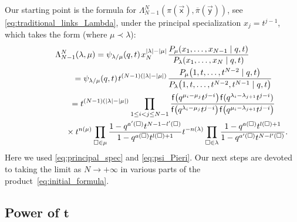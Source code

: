 \documentclass[pdftex]{sigma}
\numberwithin{equation}{section}
\begin{document}
Our starting point is the formula for
$\Lambda^{N}_{N-1}(\pi(\vec{\mathsf{x}}),\overline\pi(\vec{\mathsf{y}}))$, see
\eqref{eq:traditional_links_Lambda},
under the principal
specialization $x_j=t^{j-1}$, which takes the form (where $\mu\prec\lambda$):
\begin{gather}
	\nonumber
		\Lambda^{N}_{N-1}(\lambda,\mu)
		=
		\psi_{\lambda/\mu}(q,t)\hspace{1pt} x_N^{|\lambda|-|\mu|}\hspace{1pt}
		\frac{
		P_\mu(x_1,\dots,x_{N-1} \mid q,t )
		}
		{P_\lambda(x_1,\dots,x_N \mid q,t)}
		\\
		\nonumber
\hphantom{\Lambda^{N}_{N-1}(\lambda,\mu)}{}
=
		\psi_{\lambda/\mu}
		(q,t)\hspace{1pt}
		t^{(N-1)(|\lambda|-|\mu|)}\hspace{1pt}
		\frac{P_\mu\big(1,t,\dots,t^{N-2}\mid q,t \big)}{P_\lambda\big(1,t,\dots,t^{N-2},t^{N-1}\mid q,t\big)}
		\\
		\nonumber
\hphantom{\Lambda^{N}_{N-1}(\lambda,\mu)}{}
=
		t^{(N-1)(|\lambda|-|\mu|)}
		\prod_{1\le i<j\le N-1}
		\frac{\mathsf{f}\big(q^{\mu_i-\mu_j}t^{j-i}\big)\hspace{1pt}
		\mathsf{f}(q^{\lambda_i-\lambda_{j+1}}t^{j-i})}
		{\mathsf{f}\big(q^{\lambda_i-\mu_j}t^{j-i}\big)\hspace{1pt}
		\mathsf{f}\big(q^{\mu_i-\lambda_{j+1}}t^{j-i}\big)}
		\\
\hphantom{\Lambda^{N}_{N-1}(\lambda,\mu)=}{}
\times
		t^{n(\mu)}\prod_{\square\in \mu}
		\frac{1-q^{a'(\square)}t^{N-1-l'(\square)}}
		{1-q^{a(\square)}t^{l(\square)+1}}
		t^{-n(\lambda)}
		\prod_{\square\in \lambda}
		\frac
		{1-q^{a(\square)}t^{l(\square)+1}}
		{1-q^{a'(\square)}t^{N-l'(\square)}}.		\label{eq:initial_formula}
\end{gather}
Here we used
\eqref{eq:principal_spec} and
\eqref{eq:psi_Pieri}.
Our next steps are devoted to
taking the limit as
$N\to+\infty$
in various parts of the product~\eqref{eq:initial_formula}.

\subsection[Power of t]{Power of $\boldsymbol{t}$}
\end{document}
